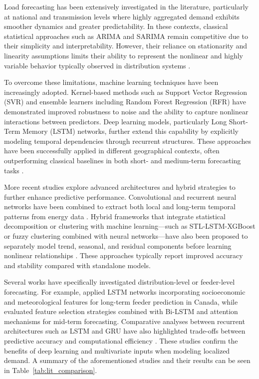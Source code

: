 Load forecasting has been extensively investigated in the literature, particularly at national and transmission levels where highly aggregated demand exhibits smoother dynamics and greater predictability. In these contexts, classical statistical approaches such as ARIMA and SARIMA remain competitive due to their simplicity and interpretability. However, their reliance on stationarity and linearity assumptions limits their ability to represent the nonlinear and highly variable behavior typically observed in distribution systems \cite{Matsila2018}.

To overcome these limitations, machine learning techniques have been increasingly adopted. Kernel-based methods such as Support Vector Regression (SVR) and ensemble learners including Random Forest Regression (RFR) have demonstrated improved robustness to noise and the ability to capture nonlinear interactions between predictors. Deep learning models, particularly Long Short-Term Memory (LSTM) networks, further extend this capability by explicitly modeling temporal dependencies through recurrent structures. These approaches have been successfully applied in different geographical contexts, often outperforming classical baselines in both short- and medium-term forecasting tasks \cite{Aquila2023, DosSantos2024, Dong2019, Alsalem2025}.

More recent studies explore advanced architectures and hybrid strategies to further enhance predictive performance. Convolutional and recurrent neural networks have been combined to extract both local and long-term temporal patterns from energy data \cite{Maleki2024}. Hybrid frameworks that integrate statistical decomposition or clustering with machine learning—such as STL-LSTM-XGBoost or fuzzy clustering combined with neural networks—have also been proposed to separately model trend, seasonal, and residual components before learning nonlinear relationships \cite{Zhang2023, Hussein2024, Alsalem2025}. These approaches typically report improved accuracy and stability compared with standalone models.

Several works have specifically investigated distribution-level or feeder-level forecasting. For example, \cite{Dong2019} applied LSTM networks incorporating socioeconomic and meteorological features for long-term feeder prediction in Canada, while \cite{Yaprakdal2023} evaluated feature selection strategies combined with Bi-LSTM and attention mechanisms for mid-term forecasting. Comparative analyses between recurrent architectures such as LSTM and GRU have also highlighted trade-offs between predictive accuracy and computational efficiency \cite{Becker2024}. These studies confirm the benefits of deep learning and multivariate inputs when modeling localized demand. A summary of the aforementioned studies and their results can be seen in Table~\ref{tab:lit_comparison}.

